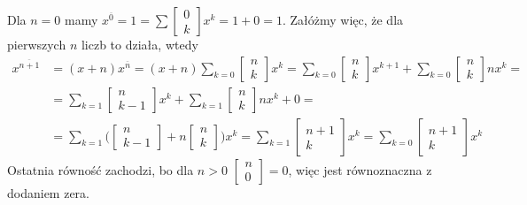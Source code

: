 \documentclass{article}[13pt]
\begin{document}
Dla $n=0$ mamy $x^{\overline0}=1=\sum\begin{bmatrix}0\\k\end{bmatrix}x^k=1+0=1$. Załóżmy więc, że dla pierwszych $n$ liczb to działa, wtedy
\begin{align*}
    x^{\overline{n+1}}&=(x+n)x^{\overline{n}}=(x+n)\sum\limits_{k=0}\begin{bmatrix}n\\k\end{bmatrix}x^k=\sum\limits_{k=0}\begin{bmatrix}n\\k\end{bmatrix}x^{k+1}+\sum\limits_{k=0}\begin{bmatrix}n\\k\end{bmatrix}nx^k=\\
    &=\sum\limits_{k=1}\begin{bmatrix}n\\k-1\end{bmatrix}x^k+\sum\limits_{k=1}\begin{bmatrix}n\\k\end{bmatrix}nx^k+0=\\
    &=\sum\limits_{k=1}\Big(\begin{bmatrix}n\\k-1\end{bmatrix}+n\begin{bmatrix}n\\k\end{bmatrix}\Big)x^k=\sum\limits_{k=1}\begin{bmatrix}
        n+1\\k
    \end{bmatrix}x^k=\sum\limits_{k=0}\begin{bmatrix}
        n+1\\k
    \end{bmatrix}x^k
\end{align*}
Ostatnia równość zachodzi, bo dla $n>0$ $\begin{bmatrix}
    n\\0
\end{bmatrix}=0$, więc jest równoznaczna z dodaniem zera.
\end{document}
